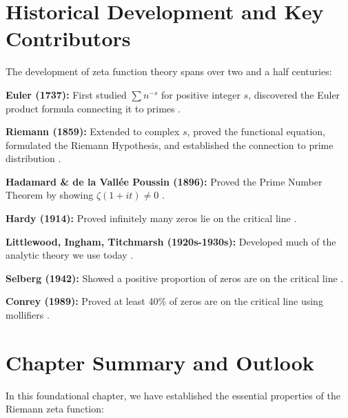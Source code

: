 \section{Historical Development and Key Contributors}
\label{sec:historical_development}

\begin{historicalnote}
The development of zeta function theory spans over two and a half centuries:

\textbf{Euler (1737):} First studied $\sum n^{-s}$ for positive integer $s$, discovered the Euler product formula connecting it to primes \cite{edwards1974}.

\textbf{Riemann (1859):} Extended to complex $s$, proved the functional equation, formulated the Riemann Hypothesis, and established the connection to prime distribution \cite{riemann1859}.

\textbf{Hadamard \& de la Vallée Poussin (1896):} Proved the Prime Number Theorem by showing $\zeta(1+it) \neq 0$ \cite{davenport2000}.

\textbf{Hardy (1914):} Proved infinitely many zeros lie on the critical line \cite{hardy1914}.

\textbf{Littlewood, Ingham, Titchmarsh (1920s-1930s):} Developed much of the analytic theory we use today \cite{titchmarsh1986}.

\textbf{Selberg (1942):} Showed a positive proportion of zeros are on the critical line \cite{selberg1942}.

\textbf{Conrey (1989):} Proved at least 40\% of zeros are on the critical line using mollifiers \cite{conrey1989}.
\end{historicalnote}

\section{Chapter Summary and Outlook}
\label{sec:chapter_summary}

In this foundational chapter, we have established the essential properties of the Riemann zeta function:


